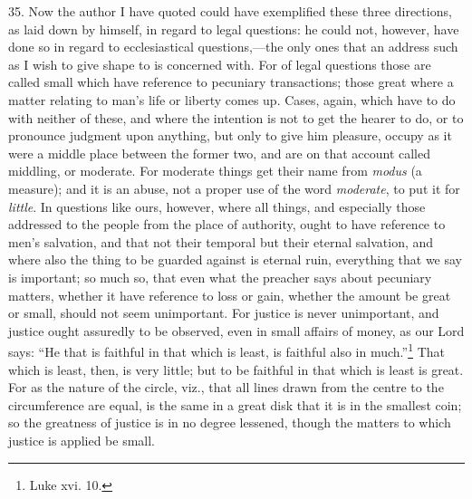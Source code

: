 35. Now the author I have quoted could have exemplified these three directions, as laid down by himself, in regard to legal questions: he could not, however, have done so in regard to ecclesiastical questions,—the only ones that an address such as I wish to give shape to is concerned with. For of legal questions those are called small which have reference to pecuniary transactions; those great where a matter relating to man’s life or liberty comes up. Cases, again, which have to do with neither of these, and where the intention is not to get the hearer to do, or to pronounce judgment upon anything, but only to give him pleasure, occupy as it were a middle place between the former two, and are on that account called middling, or moderate. For moderate things get their name from \emph{modus} (a measure); and it is an abuse, not a proper use of the word \emph{ moderate}, to put it for \emph{little}. In questions like ours, however, where all things, and especially those addressed to the people from the place of authority, ought to have reference to men’s salvation, and that not their temporal but their eternal salvation, and where also the thing to be guarded against is eternal ruin, everything that we say is important; so much so, that even what the preacher says about pecuniary matters, whether it have reference to loss or gain, whether the amount be great or small, should not seem unimportant. For justice is never unimportant, and justice ought assuredly to be observed, even in small affairs of money, as our Lord says: “He that is faithful in that which is least, is faithful also in much.”\footnote{Luke xvi. 10.} That which is least, then, is very little; but to be faithful in that which is least is great. For as the nature of the circle, viz., that all lines drawn from the centre to the circumference are equal, is the same in a great disk that it is in the smallest coin; so the greatness of justice is in no degree lessened, though the matters to which justice is applied be small.


